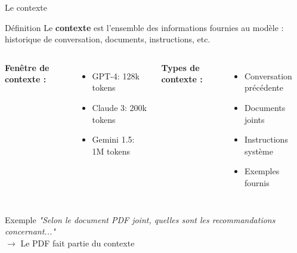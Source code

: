 \begin{frame}{Le contexte}
\begin{block}{Définition}
Le \textbf{contexte} est l'ensemble des informations fournies au modèle : historique de conversation, documents, instructions, etc.
\end{block}

\vspace{0.3cm}

\begin{columns}
\textbf{Fenêtre de contexte :}
\begin{itemize}
    \item GPT-4: 128k tokens
    \item Claude 3: 200k tokens
    \item Gemini 1.5: 1M tokens
\end{itemize}

\textbf{Types de contexte :}
\begin{itemize}
    \item Conversation précédente
    \item Documents joints
    \item Instructions système
    \item Exemples fournis
\end{itemize}
\end{columns}

\vspace{0.3cm}

\begin{exampleblock}{Exemple}
\textit{"Selon le document PDF joint, quelles sont les recommandations concernant..."} \\
$\rightarrow$ Le PDF fait partie du contexte
\end{exampleblock}
\end{frame}

